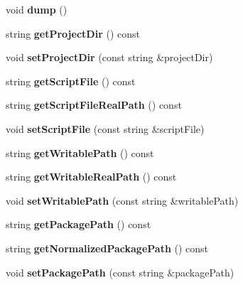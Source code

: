 \begin{DoxyCompactItemize}
void {\bfseries dump} ()
\item 
\mbox{\label{classProjectConfig_a1c310fa57b51f1a5814687139fd8ef34}} 
string {\bfseries get\+Project\+Dir} () const
\item 
\mbox{\label{classProjectConfig_a236de63da9eb7f7504397faba5b8ba3e}} 
void {\bfseries set\+Project\+Dir} (const string \&project\+Dir)
\item 
\mbox{\label{classProjectConfig_a7a6778a0a55e0f2416da3c0bf5cd3ce8}} 
string {\bfseries get\+Script\+File} () const
\item 
\mbox{\label{classProjectConfig_a62a3784de7881f287ffdf802b8b64cc9}} 
string {\bfseries get\+Script\+File\+Real\+Path} () const
\item 
\mbox{\label{classProjectConfig_a437db139852cfe5b6261754216f40129}} 
void {\bfseries set\+Script\+File} (const string \&script\+File)
\item 
\mbox{\label{classProjectConfig_a0fed41ce7f9f3ac1f275f4f8d072abc6}} 
string {\bfseries get\+Writable\+Path} () const
\item 
\mbox{\label{classProjectConfig_ad0c5a0ab16bcc7d51347378badf389fb}} 
string {\bfseries get\+Writable\+Real\+Path} () const
\item 
\mbox{\label{classProjectConfig_a8c5a61f99f08dc24df7e71c6b120b538}} 
void {\bfseries set\+Writable\+Path} (const string \&writable\+Path)
\item 
\mbox{\label{classProjectConfig_a0d994ee2d8bfa382d8ad052a40e3fd14}} 
string {\bfseries get\+Package\+Path} () const
\item 
\mbox{\label{classProjectConfig_ad1567d49ae80efbbc64f30682180e48b}} 
string {\bfseries get\+Normalized\+Package\+Path} () const
\item 
\mbox{\label{classProjectConfig_aeea4d6d2383272601b1cdfd94eedfb58}} 
void {\bfseries set\+Package\+Path} (const string \&package\+Path)

\end{DoxyCompactItemize}
